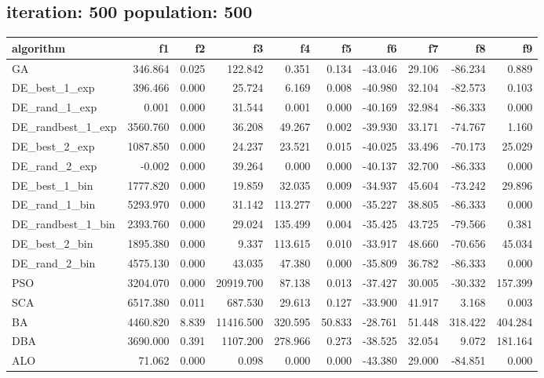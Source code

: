 \documentclass[12pt]{article}
\begin{document}
\subsection{iteration: 500 population: 500}

    \begin{table}[H]
    \centering
    \tiny 
    
    \begin{adjustbox}{width=1\textwidth}
        
\begin{tabular}{lrrrrrrrrr}
    \toprule
    algorithm &       f1 &    f2 &        f3 &      f4 &     f5 &      f6 &     f7 &      f8 &      f9 \\
    \midrule
    GA & 346.864 & 0.025 & 122.842 & 0.351 & 0.134 & -43.046 & 29.106 & -86.234 & 0.889 \\
    DE\_best\_1\_exp & 396.466 & 0.000 & 25.724 & 6.169 & 0.008 & -40.980 & 32.104 & -82.573 & 0.103 \\
    DE\_rand\_1\_exp & 0.001 & 0.000 & 31.544 & 0.001 & 0.000 & -40.169 & 32.984 & -86.333 & 0.000 \\
    DE\_randbest\_1\_exp & 3560.760 & 0.000 & 36.208 & 49.267 & 0.002 & -39.930 & 33.171 & -74.767 & 1.160 \\
    DE\_best\_2\_exp & 1087.850 & 0.000 & 24.237 & 23.521 & 0.015 & -40.025 & 33.496 & -70.173 & 25.029 \\
    DE\_rand\_2\_exp & -0.002 & 0.000 & 39.264 & 0.000 & 0.000 & -40.137 & 32.700 & -86.333 & 0.000 \\
    DE\_best\_1\_bin & 1777.820 & 0.000 & 19.859 & 32.035 & 0.009 & -34.937 & 45.604 & -73.242 & 29.896 \\
    DE\_rand\_1\_bin & 5293.970 & 0.000 & 31.142 & 113.277 & 0.000 & -35.227 & 38.805 & -86.333 & 0.000 \\
    DE\_randbest\_1\_bin & 2393.760 & 0.000 & 29.024 & 135.499 & 0.004 & -35.425 & 43.725 & -79.566 & 0.381 \\
    DE\_best\_2\_bin & 1895.380 & 0.000 & 9.337 & 113.615 & 0.010 & -33.917 & 48.660 & -70.656 & 45.034 \\
    DE\_rand\_2\_bin & 4575.130 & 0.000 & 43.035 & 47.380 & 0.000 & -35.809 & 36.782 & -86.333 & 0.000 \\
    PSO & 3204.070 & 0.000 & 20919.700 & 87.138 & 0.013 & -37.427 & 30.005 & -30.332 & 157.399 \\
    SCA & 6517.380 & 0.011 & 687.530 & 29.613 & 0.127 & -33.900 & 41.917 & 3.168 & 0.003 \\
    BA & 4460.820 & 8.839 & 11416.500 & 320.595 & 50.833 & -28.761 & 51.448 & 318.422 & 404.284 \\
    DBA & 3690.000 & 0.391 & 1107.200 & 278.966 & 0.273 & -38.525 & 32.054 & 9.072 & 181.164 \\
    ALO & 71.062 & 0.000 & 0.098 & 0.000 & 0.000 & -43.380 & 29.000 & -84.851 & 0.000 \\
    \bottomrule
\end{tabular}
        

\end{adjustbox}
\end{table}
\end{document}

